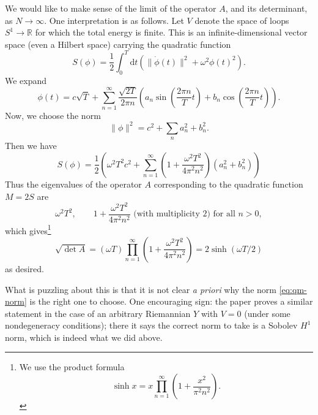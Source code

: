 \documentclass[12pt,letterpaper,reqno]{article}
\numberwithin{equation}{section}
\newcommand{\R}{\ensuremath{\mathbb R}}
\newcommand{\half}{\ensuremath{\frac{1}{2}}}
\newcommand{\de}{\mathrm{d}}
\newcommand{\norm}[1]{\lVert#1\rVert}
\newcommand{\ti}[1]{\textit{#1}}
\newcommand{\fixme}[1]{{\color{orange}{[#1]}}}
\begin{document}
We would like to make sense of the limit of the operator $A$, and its determinant, as $N \to \infty$.
One interpretation is as follows.
Let $V$ denote the space of 
loops $S^1 \to \R$ for which the total energy is finite.
This is an infinite-dimensional vector space (even a Hilbert space)
carrying the quadratic function
\begin{equation}
  S(\phi) = \half \int_{0}^T \de t \left( \norm{\dot \phi(t)}^2 + \omega^2 \phi(t)^2 \right).
\end{equation}
We expand
\begin{equation}
  \phi(t) = c \sqrt{T} + \sum_{n=1}^\infty \frac{\sqrt{2T}}{2 \pi n} \left(a_n \sin\left(\frac{2 \pi n}{T} t\right) + b_n \cos\left(\frac{2 \pi n}{T} t\right)\right). 
\end{equation}
Now, we choose the norm
\begin{equation} \label{eq:qm-norm}
  \norm{\phi}^2 = c^2 + \sum_n a_n^2 + b_n^2.
\end{equation}
Then we have
\begin{equation}
  S(\phi) = \half \left( \omega^2 T^2 c^2 + \sum_{n=1}^\infty \left(1 +  \frac{\omega^2 T^2}{4 \pi^2 n^2} \right) (a_n^2 + b_n^2) \right)
\end{equation}
Thus the eigenvalues of the operator $A$ corresponding to the quadratic
function $M = 2S$ are
\begin{equation}
  \omega^2 T^2, \qquad 1 + \frac{\omega^2 T^2}{4 \pi^2 n^2} \text{ (with multiplicity $2$) for all $n > 0$},
\end{equation}
which gives\footnote{We use the product formula
\begin{equation} \label{eq:sinh-formula}
  \sinh x = x \prod_{n=1}^\infty \left( 1 + \frac{x^2}{\pi^2 n^2} \right).
\end{equation}
}
\begin{equation}
  \sqrt{\det A} = (\omega T) \prod_{n=1}^\infty \left( 1 + \frac{\omega^2 T^2}{4 \pi^2 n^2} \right) = 2 \sinh (\omega T/2)  
\end{equation}
as desired.

What is puzzling about this is that it is not clear \ti{a priori} why the norm
\eqref{eq:qm-norm} is the right one to choose. One encouraging sign: the paper 
\cite{Ludewig2016} proves a similar statement in the case of an 
arbitrary Riemannian $Y$ with $V = 0$ (under some nondegeneracy conditions);
there it says the correct norm to take is a Sobolev $H^1$ norm, which is indeed
what we did above.
\fixme{we can verify more directly that the two correspond by making the 
appropriate rescalings in the discretization}
\end{document}
